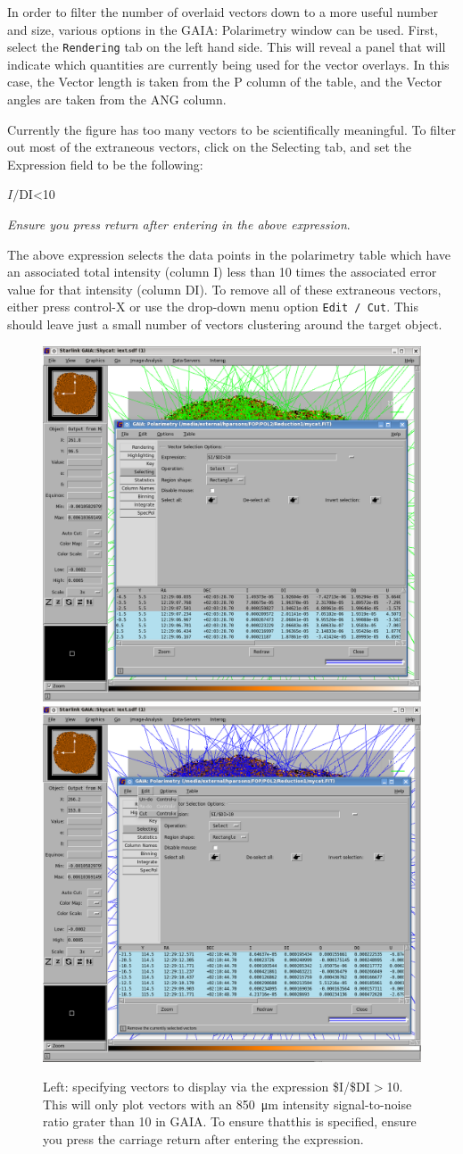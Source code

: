 In order to filter the number of overlaid vectors down to a more useful number and size,
various options in the GAIA: Polarimetry window can be used. First, select the \texttt{Rendering}
tab on the left hand side. This will reveal a panel that will indicate which quantities
are currently being used for the vector overlays. In this case, the Vector length is taken
from the P column of the table, and the Vector angles are taken from the ANG column.

Currently the figure has too many vectors to be scientifically meaningful. To filter
out most of the extraneous vectors, click on the Selecting tab, and set the Expression
field to be the following:

\begin{terminalv}
$I/$DI<10
\end{terminalv}

\emph{Ensure you press return after entering in the above expression}.

The above expression selects the data points in the polarimetry table which have an
associated total intensity (column I) less than 10 times the
associated error value for that intensity (column DI). To remove all of these
extraneous vectors, either press control-X or use the drop-down menu option \texttt{Edit / Cut}.
This should leave just a small number of vectors clustering around the target object.

\begin{figure}[t!]
\begin{center}
\includegraphics[width=0.46\linewidth]{sc22-gaia-plot-vectors-4.png}
\includegraphics[width=0.46\linewidth]{sc22-gaia-plot-vectors-6.png}
\label{fig:gaia-plot-vectors2}
\caption [Selecting Vectors in GAIA]{
  \small Left: specifying vectors to display via the expression \$I/\$DI$>$10. This will only plot
vectors with an \SI{850}{\micro\metre} intensity signal-to-noise ratio grater than 10 in GAIA. To ensure thatthis is specified,
ensure you press the carriage return after entering the expression.
}
\end{center}
\end{figure}

